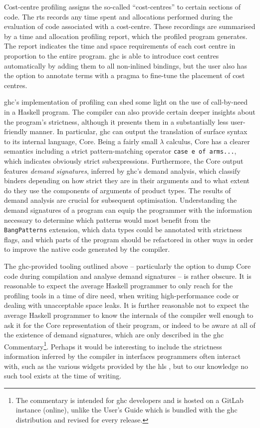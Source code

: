 \documentclass[thesis=B,english]{FITthesis}[2019/12/23]
\newcommand{\hsCode}[1]{\texttt{#1}}
\begin{document}
Cost-centre profiling assigns the so-called ``cost-centres'' to certain
sections of code. The \acrshort{rts} records any time spent and allocations
performed during the evaluation of code associated with a cost-centre. These
recordings are summarised by a time and allocation profiling report, which the
profiled program generates. The report indicates the time and space
requirements of each cost centre in proportion to the entire program.
\acrshort{ghc} is able to introduce cost centres automatically by adding them
to all non-in\-lined bindings, but the user also has the option to annotate
terms with a pragma to fine-tune the placement of cost centres.

\acrshort{ghc}'s implementation of profiling can shed some light on the use of
call-by-need in a Haskell program. The compiler can also provide certain deeper
insights about the program's strictness, although it presents them in a
substantially less user-friendly manner. In particular, \acrshort{ghc} can
output the translation of surface syntax to its internal language, Core. Being
a fairly small $\lambda$ calculus, Core has a clearer semantics including a
strict pattern-matching operator \hsCode{case e of arms...}, which indicates
obviously strict subexpressions. Furthermore, the Core output features
\textit{demand signatures}, inferred by \acrshort{ghc}'s demand
analysis\cite{cmtary-demand-analysis}, which classify binders depending on how
strict they are in their arguments and to what extent do they use the
components of arguments of product types. The results of demand analysis are
crucial for subsequent optimisation. Understanding the demand signatures of a
program can equip the programmer with the information necessary to determine
which patterns would most benefit from the \texttt{BangPatterns} extension,
which data types could be annotated with strictness flags, and which parts of
the program should be refactored in other ways in order to improve the native
code generated by the compiler.

The \acrshort{ghc}-provided tooling outlined above -- particularly the option
to dump Core code during compilation and analyse demand signatures -- is rather
obscure. It is reasonable to expect the average Haskell programmer to only
reach for the profiling tools in a time of dire need, when writing
high-performance code or dealing with unacceptable space leaks. It is further
reasonable not to expect the average Haskell programmer to know the internals
of the compiler well enough to ask it for the Core representation of their
program, or indeed to be aware at all of the existence of demand signatures,
which are only described in the \acrshort{ghc} Commentary\footnote{
	The commentary is intended for \acrshort{ghc} developers and is hosted on a
	GitLab instance (online), unlike the User's Guide which is bundled with the
	\acrshort{ghc} distribution and revised for every release.
}. Perhaps it would be interesting to include the strictness information
inferred by the compiler in interfaces programmers often interact with, such as
the various widgets provided by the \acrfull{hls} \cite{gh-hls}, but
to our knowledge no such tool exists at the time of writing.
\end{document}

